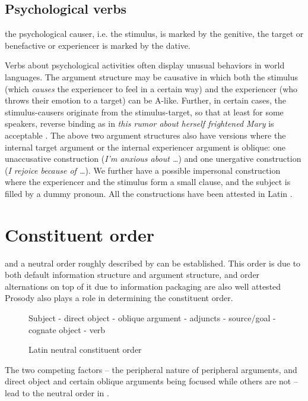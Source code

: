 \documentclass[a4paper, oneside, 12pt]{report}
\newcommand{\form}[1]{\emph{#1}}
\begin{document}
\section{Psychological verbs}\label{sec:verb-frame.psy}

the psychological causer, i.e. the stimulus, is marked by the genitive,
the target or benefactive or experiencer is marked by the dative.

Verbs about psychological activities often display unusual behaviors in world languages.
The argument structure may be causative in which both the stimulus (which \emph{causes} the experiencer to feel in a certain way) and the experiencer (who throws their emotion to a target) can be A-like.
Further, in certain cases, the stimulus-causers originate from the stimulus-target,
so that at least for some speakers,
reverse binding as in \form{this rumor about herself frightened Mary} is acceptable
\citep{hornstein2002psych}.
The above two argument structures also have versions
where the internal target argument or the internal experiencer argument is oblique:
one unaccusative construction (\form{I'm anxious about \dots}) and 
one unergative construction (\form{I rejoice because of \dots}).
We further have a possible impersonal construction where the experiencer and the stimulus
form a small clause,
and the subject is filled by a dummy pronoun.
All the constructions have been attested in Latin \citep{giusti2019psychological}.

\chapter{Constituent order}\label{chap:order}

and a neutral order roughly described by  can be established.
This order is due to both default information structure 
and argument structure,
and order alternations on top of it
due to information packaging are also well attested 
Prosody also plays a role in determining the constituent order.

\begin{figure}[H]
    \centering
    Subject - direct object - oblique argument - adjuncts - source/goal - cognate object - verb
    \caption{Latin neutral constituent order}
    \label{fig:latin-neutral-clause}
\end{figure}

The two competing factors -- the peripheral nature of peripheral arguments,
    and direct object and certain oblique arguments being focused while others are not --
    lead to the neutral order in . 
\end{document}
